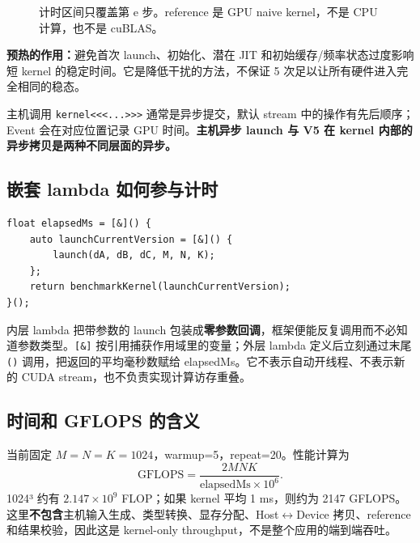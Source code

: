 \documentclass[UTF8,11pt,a4paper,fontset=fandol]{ctexart}
\newcommand{\code}[1]{\nolinkurl{#1}}
\newcommand{\pagebreakhere}{\clearpage}
\begin{document}
\begin{figure}[H]\centering
{}
\caption{计时区间只覆盖第 e 步。reference 是 GPU naive kernel，不是 CPU 计算，也不是 cuBLAS。}
\end{figure}

\textbf{预热的作用：}避免首次 launch、初始化、潜在 JIT 和初始缓存/频率状态过度影响短 kernel 的稳定时间。它是降低干扰的方法，不保证 5 次足以让所有硬件进入完全相同的稳态。

主机调用 \code{kernel<<<...>>>} 通常是异步提交，默认 stream 中的操作有先后顺序；Event 会在对应位置记录 GPU 时间。\textbf{主机异步 launch 与 V5 在 kernel 内部的异步拷贝是两种不同层面的异步。}
\pagebreakhere

\subsection{嵌套 lambda 如何参与计时}
\begin{lstlisting}[numbers=none]
float elapsedMs = [&]() {
    auto launchCurrentVersion = [&]() {
        launch(dA, dB, dC, M, N, K);
    };
    return benchmarkKernel(launchCurrentVersion);
}();
\end{lstlisting}
内层 lambda 把带参数的 launch 包装成\textbf{零参数回调}，框架便能反复调用而不必知道参数类型。\code{[&]} 按引用捕获作用域里的变量；外层 lambda 定义后立刻通过末尾 \code{()} 调用，把返回的平均毫秒数赋给 elapsedMs。它不表示自动开线程、不表示新的 CUDA stream，也不负责实现计算访存重叠。

\subsection{时间和 GFLOPS 的含义}
当前固定 $M=N=K=1024$，warmup=5，repeat=20。性能计算为
\[
\mathrm{GFLOPS}=\frac{2MNK}{\mathrm{elapsedMs}\times10^6}.
\]
1024³ 约有 $2.147\times10^9$ FLOP；如果 kernel 平均 1 ms，则约为 2147 GFLOPS。这里\textbf{不包含}主机输入生成、类型转换、显存分配、Host$\leftrightarrow$Device 拷贝、reference 和结果校验，因此这是 kernel-only throughput，不是整个应用的端到端吞吐。
\end{document}
